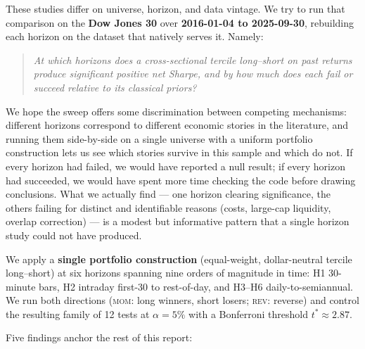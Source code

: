 \documentclass[10pt,conference,compsoc]{IEEEtran}
\newcommand{\MOM}{\textsc{mom}}  \newcommand{\REV}{\textsc{rev}}
\begin{document}
These studies differ on universe, horizon, and data vintage. We try to run that comparison on the \textbf{Dow Jones 30} over
\textbf{2016-01-04 to 2025-09-30}, rebuilding each horizon on the
dataset that natively serves it. Namely:
\begin{quote}
\itshape At which horizons does a cross-sectional tercile long--short
on past returns produce significant \emph{positive} net Sharpe, and by
how much does each fail or succeed relative to its classical priors?
\end{quote}
We hope the sweep offers some discrimination between competing
mechanisms: different horizons correspond to different economic
stories in the literature, and running them side-by-side on a
single universe with a uniform portfolio construction lets us see
which stories survive in this sample and which do not. If every
horizon had failed, we would have reported a null result; if every
horizon had succeeded, we would have spent more time checking the
code before drawing conclusions. What we actually find --- one
horizon clearing significance, the others failing for distinct and
identifiable reasons (costs, large-cap liquidity, overlap
correction) --- is a modest but informative pattern that a single
horizon study could not have produced.

We apply a \textbf{single portfolio construction} (equal-weight,
dollar-neutral tercile long--short) at six horizons spanning nine orders
of magnitude in time: H1 30-minute bars, H2 intraday first-30 to
rest-of-day, and H3--H6 daily-to-semiannual. We run both directions (\MOM{}: long winners, short losers; \REV{}: reverse) and control the resulting family of 12 tests at $\alpha = 5\%$ with a Bonferroni threshold $t^{*}\!\approx 2.87$.

Five findings anchor the rest of this report:
\end{document}
